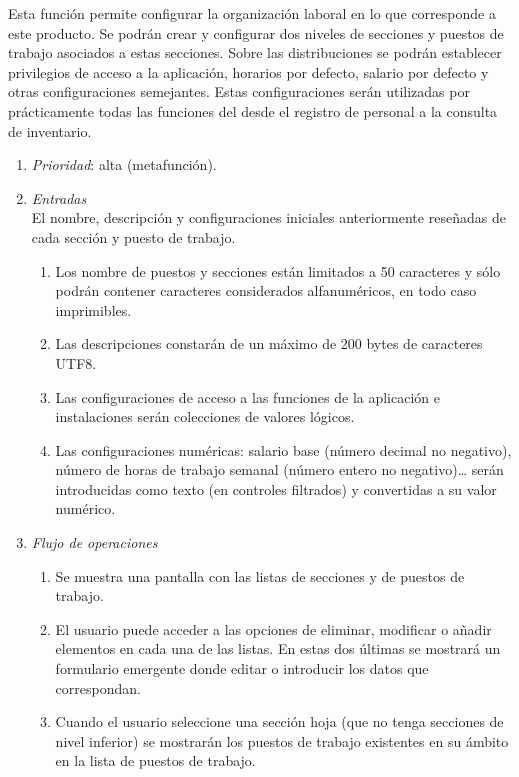 	Esta función permite configurar la organización laboral en lo que corresponde a este producto. Se podrán crear y configurar dos niveles de secciones y puestos de trabajo asociados a estas secciones. Sobre las distribuciones se podrán establecer privilegios de acceso a la aplicación, horarios por defecto, salario por defecto y otras configuraciones semejantes. Estas configuraciones serán utilizadas por prácticamente todas las funciones del \software desde el registro de personal a la consulta de inventario.

	\begin{enumerate}
		\item \textit{Prioridad}: alta (metafunción).
		\item \textit{Entradas}\\
			El nombre, descripción y configuraciones iniciales anteriormente reseñadas de cada sección y puesto de trabajo.
			\begin{enumerate}
				\item Los nombre de puestos y secciones están limitados a 50 caracteres y sólo podrán contener caracteres considerados alfanuméricos, en todo caso imprimibles.
				\item Las descripciones constarán de un máximo de 200 bytes de caracteres \gls{UTF8}.
				\item Las configuraciones de acceso a las funciones de la aplicación e instalaciones serán colecciones de valores lógicos.
				\item Las configuraciones numéricas: salario base (número decimal no negativo), número de horas de trabajo semanal (número entero no negativo)\dots{} serán introducidas como texto (en controles filtrados) y convertidas a su valor numérico.
			\end{enumerate}
		\item \textit{Flujo de operaciones}
			\begin{enumerate}
				\item Se muestra una pantalla con las listas de secciones y de puestos de trabajo.
				\item El usuario puede acceder a las opciones de eliminar, modificar o añadir elementos en cada una de las listas. En estas dos últimas se mostrará un formulario emergente donde editar o introducir los datos que correspondan.
				\item Cuando el usuario seleccione una sección hoja (que no tenga secciones de nivel inferior) se mostrarán los puestos de trabajo existentes en su ámbito en la lista de puestos de trabajo.

\end{enumerate}
\end{enumerate}
